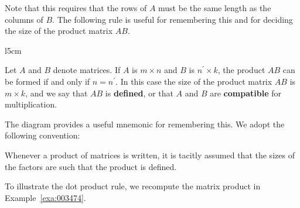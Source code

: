 \noindent Note that this requires that the rows of $A$ must be the same length as the columns of $B$. The following rule is useful for remembering this and for deciding the size of the product matrix $AB$.

\vspace{1em}

 \begin{wrapfigure}[4]{l}{5cm}
 \centering
 
 \end{wrapfigure}

\noindent Let $A$ and $B$ denote matrices. If $A$ is $m \times n$ and $B$ is $n^\prime \times k$, the product $AB$ can be formed if and only if $n=n^\prime$. In this case the size of the product matrix $AB$ is $m \times k$, and we say that $AB$ is \textbf{defined}, or that $A$ and $B$ are \textbf{compatible} for multiplication.

\noindent The diagram provides a useful mnemonic for remembering this. We adopt the following convention:

\vspace{1em}

\noindent Whenever a product of matrices is written, it is tacitly assumed that the sizes of the factors are such that the product is defined.

To illustrate the dot product rule, we recompute the matrix product in Example~\ref{exa:003474}.


